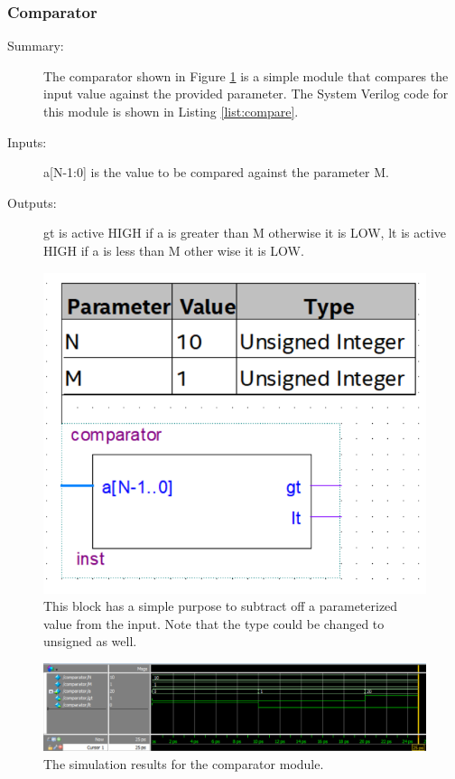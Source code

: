 \documentclass[a4paper]{article}
\begin{document}
\subsubsection{Comparator}
\begin{description}
    \item[Summary: ] The comparator shown in Figure \ref{fig:compare} is a simple module that compares the input value against the provided parameter. The System Verilog code for this module is shown in Listing \ref{list:compare}.
 
    \item[Inputs: ] a[N-1:0] is the value to be compared against the parameter M.
    
    \item[Outputs: ] gt is active HIGH if a is greater than M otherwise it is LOW, lt is active HIGH if a is less than M other wise it is LOW.
\end{description}

\begin{figure}[H]
    \centering
    \includegraphics[width=.5\textwidth]{Images/comparator.png}
    \caption{This block has a simple purpose to subtract off a parameterized value from the input. Note that the type could be changed to unsigned as well.}
    \label{fig:compare}
\end{figure}

\begin{figure}[H]
    \centering
    \includegraphics[width=5.91in]{Images/comparatorSim.png}
    \caption{The simulation results for the comparator module.}
    \label{fig:compare_sim}
\end{figure}
\end{document}
